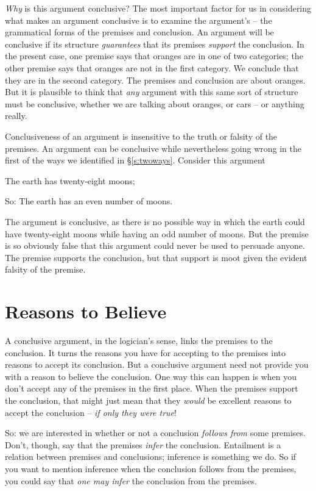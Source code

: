\emph{Why} is this argument conclusive? The most important factor for us in considering what makes an argument conclusive is to examine the argument's  – the grammatical forms of the premises and conclusion. An argument will be conclusive if its structure \emph{guarantees} that its premises \emph{support} the conclusion. In the present case, one premise says that oranges are in one of two categories; the other premise says that oranges are not in the first category. We conclude that they are in the second category. The premises and conclusion are about oranges. But it is plausible to think that \emph{any} argument with this same sort of structure must be conclusive, whether we are talking about oranges, or cars – or anything really. 

Conclusiveness of an argument is insensitive to the truth or falsity of the premises. An argument can be conclusive while nevertheless going wrong in the first of the ways we identified in §\ref{s:twoways}. Consider this argument \begin{earg}
	\item[]The earth has twenty‐eight moons;
	\item[So:]The earth has an even number of moons.
\end{earg} The argument is conclusive, as there is no possible way in which the earth could have twenty-eight moons while having an odd number of moons. But the premise is so obviously false that this argument could never be used to persuade anyone. The premise supports the conclusion, but that support is moot given the evident falsity of the premise.

\section{Reasons to Believe}\label{ss:reasoning}

A conclusive argument, in the logician's sense, links the premises to the conclusion. It turns the reasons you have for accepting to the premises into reasons to accept its conclusion. But a conclusive argument need not provide you with a reason to believe the conclusion. One way this can happen is when you don't accept any of the premises in the first place. When the premises support the conclusion, that might just mean that they \emph{would} be excellent reasons to accept the conclusion – \emph{if only they were true}!

So: we are interested in whether or not a conclusion \emph{follows from} some premises. Don't, though, say that the premises \emph{infer} the conclusion. Entailment is a relation between premises and conclusions; inference is something we do. So if you want to mention inference when the conclusion follows from the premises, you could say that \emph{one may infer} the conclusion from the premises.

